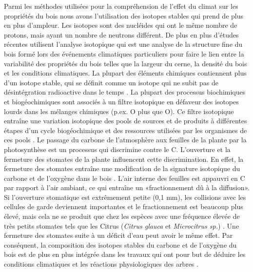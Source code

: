 \documentclass[a4paper,12pt]{report}
\begin{document}
Parmi les méthodes utilisées pour la compréhension de l'effet du climat sur les propriétés du bois nous avons l'utilisation des isotopes stables qui prend de plus en plus d'ampleur. Les isotopes sont des nucléides qui ont le même nombre de protons, mais ayant un nombre de neutrons différent. De plus en plus d'études récentes utilisent l'analyse isotopique qui est une analyse de la structure fine du bois formé lors des événements climatiques particuliers pour faire le lien entre la variabilité des propriétés du bois telles que la largeur du cerne, la densité du bois et les conditions climatiques. La plupart des éléments chimiques contiennent plus d'un isotope stable, qui se définit comme un isotope qui ne subit pas de désintégration radioactive dans le temps \citep{West2006}. La plupart des processus biochimiques et biogéochimiques sont associés à un filtre isotopique en défaveur des isotopes lourds dans les mélanges chimiques (p.ex. O plus que O). Ce filtre isotopique entraîne une variation isotopique des pools de sources et de produits à différentes étapes d'un cycle biogéochimique et des ressources utilisées par les organismes de ces pools \citep{Dawson2002}. Le passage du carbone de l'atmosphère aux feuilles de la plante par la photosynthèse est un processus qui discrimine contre le C. L'ouverture et la fermeture des stomates de la plante influencent cette discrimination. En effet, la fermeture des stomates entraîne une modification de la signature isotopique du carbone et de l'oxygène dans le bois \citep{Farquhar1993, Bigras2005}. L'air interne des feuilles est appauvri en C par rapport à l'air ambiant, ce qui entraîne un «fractionnement dû à la diffusion». Si l'ouverture stomatique est extrêmement petite (0,1 mm), les collisions avec les cellules de garde deviennent importantes et le fractionnement est beaucoup plus élevé, mais cela ne se produit que chez les espèces avec une fréquence élevée de très petits stomates tels que les Citrus (\textit{Citrus glauca} et \textit{Microcitrus sp.}) \citep{Farquhar1993}. Une fermeture des stomates suite à un déficit d'eau peut avoir le même effet. Par conséquent, la composition des isotopes stables du carbone et de l'oxygène du bois est de plus en plus intégrée dans les travaux qui ont pour but de déduire les conditions climatiques et les réactions physiologiques des arbres \citep{McCarroll2004, Sternberg2009,Sarris2013}. \\
\end{document}
